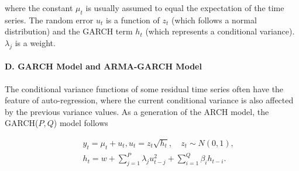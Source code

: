 where the constant $\mu_t$ is usually assumed to equal the expectation of the time series. The random error $u_t$ is a function of $z_t$ (which follows a normal distribution)  and the GARCH term $h_t$ (which represents a conditional variance).  $\lambda_j$ is a weight. 





\paragraph{D. GARCH Model and ARMA-GARCH Model}
\vspace{-0.05in}
The conditional variance functions of some residual time series often have the feature of auto-regression, where the current conditional variance is also affected by the previous  variance values. As a generation of the ARCH model, the GARCH($P,Q$) model\cite{francq2019garch} follows

\begin{eqnarray}
 &&  y_t = \mu_t + u_t ,   u_t = z_t{\sqrt{h_t}},\quad z_t\sim N(0,1),\nonumber\\
 && h_t = w+\sum_{j=1}^{P} {\lambda_j{u_{t-j}^2}}+\sum_{i=1}^{Q}{\beta_i{h_{t-i}}}.
\end{eqnarray}

